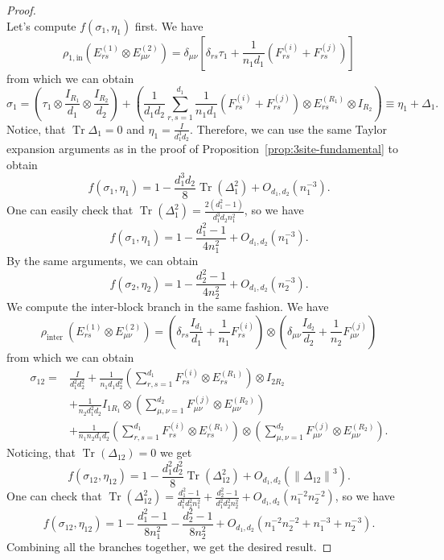 \documentclass[11pt,letterpaper]{article}
\theoremstyle{plain}
\theoremstyle{plain}
\theoremstyle{plain}
\theoremstyle{plain}
\theoremstyle{plain}
\theoremstyle{plain}
\theoremstyle{plain}
\theoremstyle{definition}
\theoremstyle{plain}
\begin{document}
\begin{proof}
$$$$
Let's compute $f\left(\sigma_1, \eta_1\right)$ first. We have
$$
\rho_{1, \mathrm{in}}\left(E_{r s}^{(1)} \otimes E_{\mu \nu}^{(2)}\right)=\delta_{\mu \nu}\left[\delta_{r s} \tau_1+\frac{1}{n_1 d_1}\left(F_{r s}^{(i)}+F_{r s}^{(j)}\right)\right]
$$
from which we can obtain
$$
\sigma_1=\left(\tau_1 \otimes \frac{I_{R_1}}{d_1} \otimes \frac{I_{R_2}}{d_2}\right)+\left(\frac{1}{d_1 d_2} \sum_{r, s=1}^{d_1} \frac{1}{n_1 d_1}\left(F_{r s}^{(i)}+F_{r s}^{(j)}\right) \otimes E_{r s}^{\left(R_1\right)} \otimes I_{R_2}\right)\equiv \eta_1+\Delta_1.
$$
Notice, that $\operatorname{Tr} \Delta_1=0$ and $\eta_1=\frac{I}{d_1^3d_2}$. Therefore, we can use the same Taylor expansion arguments as in the proof of Proposition~\ref{prop:3site-fundamental} to obtain
$$
f\left(\sigma_1, \eta_1\right)=1-\frac{d_1^3 d_2}{8} \operatorname{Tr}\left(\Delta_1^2\right)+O_{d_1,d_2}\left(n_1^{-3}\right).
$$
One can easily check that $\operatorname{Tr}\left(\Delta_1^2\right)=\frac{2\left(d_1^2-1\right)}{d_1^3 d_2 n_1^2}$, so we have
$$
f\left(\sigma_1, \eta_1\right)=1-\frac{d_1^2-1}{4 n_1^2}+O_{d_1,d_2}\left(n_1^{-3}\right).
$$
By the same arguments, we can obtain
$$
f\left(\sigma_2, \eta_2\right)=1-\frac{d_2^2-1}{4 n_2^2}+O_{d_1,d_2}\left(n_2^{-3}\right).
$$
We compute the inter-block branch in the same fashion. We have
$$
\rho_{\text {inter }}\left(E_{r s}^{(1)} \otimes E_{\mu \nu}^{(2)}\right)=\left(\delta_{r s} \frac{I_{d_1}}{d_1}+\frac{1}{n_1} F_{r s}^{(i)}\right) \otimes\left(\delta_{\mu \nu} \frac{I_{d_2}}{d_2}+\frac{1}{n_2} F_{\mu \nu}^{(j)}\right)
$$
from which we can obtain
\[
\begin{aligned}
\sigma_{12}
=&
\frac{I}{d_1^2 d_2^2}
+
\frac{1}{n_1 d_1 d_2^2}
\left(
\sum_{r,s=1}^{d_1}
F_{rs}^{(i)}\otimes E_{rs}^{(R_1)}
\right)
\otimes I_{2R_2}
\\
&+
\frac{1}{n_2 d_1^2 d_2}
I_{1R_1}\otimes
\left(
\sum_{\mu,\nu=1}^{d_2}
F_{\mu\nu}^{(j)}\otimes E_{\mu\nu}^{(R_2)}
\right)
\\
&+
\frac{1}{n_1n_2d_1d_2}
\left(
\sum_{r,s=1}^{d_1}
F_{rs}^{(i)}\otimes E_{rs}^{(R_1)}
\right)
\otimes
\left(
\sum_{\mu,\nu=1}^{d_2}
F_{\mu\nu}^{(j)}\otimes E_{\mu\nu}^{(R_2)}
\right).
\end{aligned}
\]
Noticing, that $\operatorname{Tr}\left(\Delta_{12}\right)=0$ we get
\[
    f\left(\sigma_{12}, \eta_{12}\right)=1-\frac{d_1^2 d_2^2}{8} \operatorname{Tr}\left(\Delta_{12}^2\right)+O_{d_1,d_2}\left(\left\|\Delta_{12}\right\|^3\right).
\]
One can check that $\operatorname{Tr}\left(\Delta_{12}^2\right)=\frac{d_1^2-1}{d_1^2 d_2^2 n_1^2}+\frac{d_2^2-1}{d_1^2 d_2^2 n_2^2}+O_{d_1,d_2}\left(n_1^{-2} n_2^{-2}\right)$, so we have
\[
    f\left(\sigma_{12}, \eta_{12}\right)=1-\frac{d_1^2-1}{8 n_1^2}-\frac{d_2^2-1}{8 n_2^2}+O_{d_1,d_2}\left(n_1^{-2} n_2^{-2}+n_1^{-3}+n_2^{-3}\right).
\]
Combining all the branches together, we get the desired result.
\end{proof}
\end{document}
